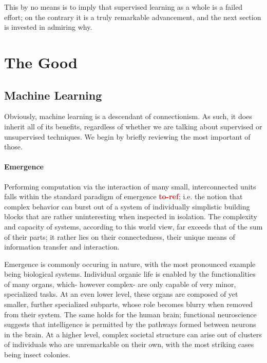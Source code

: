 \documentclass[]{article}
\newcommand\toref{\textcolor{red}{\bf{to-ref}}}
\begin{document}
This by no means is to imply that supervised learning as a whole is a failed effort; on the contrary it is a truly remarkable advancement, and the next section is invested in admiring why.

\section{The Good}

\subsection{Machine Learning}
Obviously, machine learning is a descendant of connectionism. As such, it does inherit all of its benefits, regardless of whether we are talking about supervised or unsupervised techniques. We begin by briefly reviewing the most important of those.

\paragraph{Emergence}
Performing computation via the interaction of many small, interconnected units falls within the standard paradigm of emergence \toref ; i.e. the notion that complex behavior can burst out of a system of individually simplistic building blocks that are rather uninteresting when inspected in isolation. The complexity and capacity of systems, according to this world view, far exceeds that of the sum of their parts; it rather lies on their connectedness, their unique means of information transfer and interaction. 

Emergence is commonly occuring in nature, with the most pronounced example being biological systems. Individual organic life is enabled by the functionalities of many organs, which- however complex- are only capable of very minor, specialized tasks. At an even lower level, these organs are composed of yet smaller, further specialized subparts, whose role becomes blurry when removed from their system. The same holds for the human brain; functional neuroscience suggests that intelligence is permitted by the pathways formed between neurons in the brain. At a higher level, complex societal structure can arise out of clusters of individuals who are unremarkable on their own, with the most striking cases being insect colonies.
\end{document}
